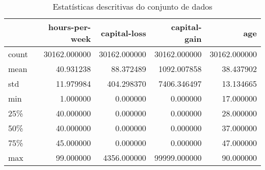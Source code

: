 \begin{table}
\centering
\caption{Estatísticas descritivas do conjunto de dados}
\label{tbl:descriptive_statistics}
\begin{tabular}{lrrrr}
\toprule
{} &  hours-per-week &  capital-loss &  capital-gain &           age \\
\midrule
count &    30162.000000 &  30162.000000 &  30162.000000 &  30162.000000 \\
mean  &       40.931238 &     88.372489 &   1092.007858 &     38.437902 \\
std   &       11.979984 &    404.298370 &   7406.346497 &     13.134665 \\
min   &        1.000000 &      0.000000 &      0.000000 &     17.000000 \\
25\%   &       40.000000 &      0.000000 &      0.000000 &     28.000000 \\
50\%   &       40.000000 &      0.000000 &      0.000000 &     37.000000 \\
75\%   &       45.000000 &      0.000000 &      0.000000 &     47.000000 \\
max   &       99.000000 &   4356.000000 &  99999.000000 &     90.000000 \\
\bottomrule
\end{tabular}
\end{table}
